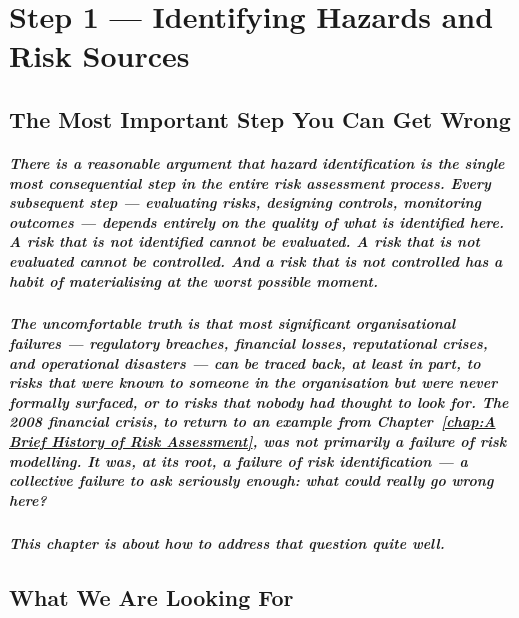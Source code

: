 \chapter{Step 1 — Identifying Hazards and Risk Sources}
\label{chap:Step 1 — Identifying Hazards and Risk Sources}

\section{The Most Important Step You Can Get Wrong}
\paragraph{There is a reasonable argument that hazard identification is the single most consequential step in the entire risk assessment process. Every subsequent step — evaluating risks, designing controls, monitoring outcomes — depends entirely on the quality of what is identified here. A risk that is not identified cannot be evaluated. A risk that is not evaluated cannot be controlled. And a risk that is not controlled has a habit of materialising at the worst possible moment.}
\paragraph{The uncomfortable truth is that most significant organisational failures — regulatory breaches, financial losses, reputational crises, and operational disasters — can be traced back, at least in part, to risks that were known to someone in the organisation but were never formally surfaced, or to risks that nobody had thought to look for. The 2008 financial crisis, to return to an example from Chapter~\ref{chap:A Brief History of Risk Assessment}, was not primarily a failure of risk modelling. It was, at its root, a failure of risk identification — a collective failure to ask seriously enough: \textbf{\textit{what could really go wrong here?}}}
\paragraph{This chapter is about how to address that question quite well.}

\section{What We Are Looking For}
